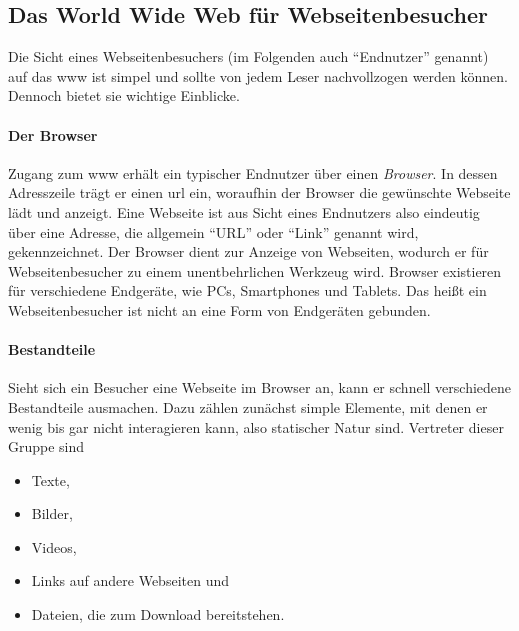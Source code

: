         \subsection{Das World Wide Web für Webseitenbesucher}
            \label{section:enduserViewOnWWW}
            Die Sicht eines Webseitenbesuchers (im Folgenden auch "`Endnutzer"' genannt)
            auf das \gls{www} ist simpel und sollte von jedem Leser nachvollzogen werden können.
            Dennoch bietet sie wichtige Einblicke.

            \paragraph*{Der Browser}
            Zugang zum \gls{www} erhält ein typischer Endnutzer über einen \textit{Browser}.
            In dessen Adresszeile trägt er einen \gls{url} ein,
            woraufhin der Browser die gewünschte Webseite lädt und anzeigt.
            Eine Webseite ist aus Sicht eines Endnutzers also eindeutig über eine
            Adresse, die allgemein "`URL"' oder "`Link"' genannt wird, gekennzeichnet.
            Der Browser dient zur Anzeige von Webseiten, wodurch er für Webseitenbesucher
            zu einem unentbehrlichen Werkzeug wird.
            Browser existieren für verschiedene Endgeräte,
            wie PCs, Smartphones und Tablets.
            Das heißt ein Webseitenbesucher ist nicht an eine Form von Endgeräten gebunden.

            \paragraph*{Bestandteile}
            Sieht sich ein Besucher eine Webseite im Browser an,
            kann er schnell verschiedene Bestandteile ausmachen.
            Dazu zählen zunächst simple Elemente, mit denen er wenig bis gar nicht
            interagieren kann, also statischer Natur sind.
            Vertreter dieser Gruppe sind

            \begin{itemize}
                \item Texte,
                \item Bilder,
                \item Videos,
                \item Links auf andere Webseiten und
                \item Dateien, die zum Download bereitstehen.
            \end{itemize}

